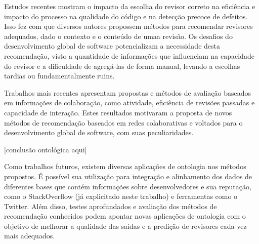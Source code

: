 \documentclass[a4paper,12pt]{monografia}
\theoremstyle{plain}
\theoremstyle{definition}
\theoremstyle{remark}
\begin{document}
Estudos recentes mostram o impacto da escolha do revisor correto na eficiência e impacto do processo na qualidade do código e na detecção precoce de defeitos. Isso fez com que diversos autores propossem métodos para recomendar revisores adequados, dado o contexto e o conteúdo de umaa revisão. Os desafios do desenvolvimento global de software potencializam a necessidade desta recomendação, visto a quantidade de informações que influenciam na capacidade do revisor e a dificuldade de agregá-las de forma manual, levando a escolhas tardias ou fundamentalmente ruins.

Trabalhos mais recentes apresentam propostas e métodos de avaliação baseados em informações de colaboração, como atividade, eficiência de revisões passadas e capacidade de interação. Estes resultados motivaram a proposta de novos métodos de recomendação baseados em redes colaborativas e voltados para o desenvolvimento global de software, com suas peculiaridades.

[conclusão ontológica aqui]

Como trabalhos futuros, existem diversas aplicações de ontologia nos métodos propostos. É possível sua utilização para integração e alinhamento dos dados de diferentes bases que contém informações sobre desenvolvedores e sua reputação, como o StackOverflow (já explicitado neste trabalho) e ferramentas como o Twitter. Além disso, testes aprofundados e avaliação dos métodos de recomendação conhecidos podem apontar novas aplicações de ontologia com o objetivo de melhorar a qualidade das saídas e a predição de revisores cada vez mais adequados.

\singlespacing



\end{document}
